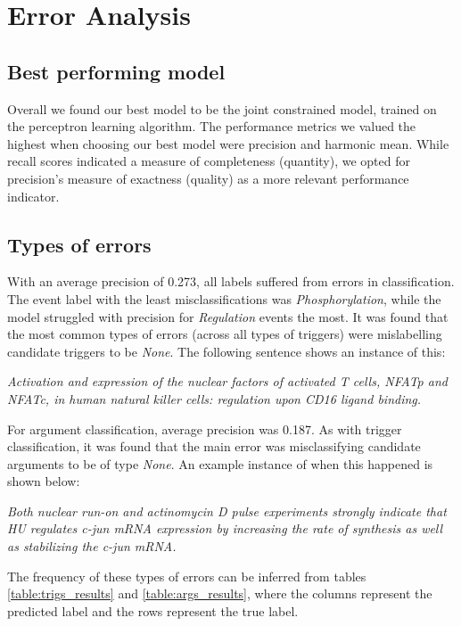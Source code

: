 \documentclass{article} %
\begin{document}
\section{Error Analysis}
\subsection{Best performing model}
Overall we found our best model to be the joint constrained model, trained on the perceptron learning algorithm. The performance metrics we valued the highest when choosing our best model were precision and harmonic mean. While recall scores indicated a measure of completeness (quantity), we opted for precision's measure of exactness (quality) as a more relevant performance indicator.

\subsection{Types of errors}
With an average precision of 0.273, all labels suffered from errors in classification. The event label with the least misclassifications was \emph{Phosphorylation}, while the model struggled with precision for \emph{Regulation} events the most. It was found that the most common types of errors (across all types of triggers) were mislabelling candidate triggers to be \emph{None}. The following sentence shows an instance of this:

\emph{Activation and expression of the nuclear factors of activated T cells, NFATp and NFATc, in human natural killer cells: regulation upon CD16 ligand binding.}

For argument classification, average precision was 0.187. As with trigger classification, it was found that the main error was misclassifying candidate arguments to be of type \emph{None}. An example instance of when this happened is shown below:

\emph{Both nuclear run-on and actinomycin D pulse experiments strongly indicate that HU regulates c-jun mRNA expression by increasing the rate of synthesis as well as stabilizing the c-jun mRNA.}

The frequency of these types of errors can be inferred from tables \ref{table:trigs_results} and \ref{table:args_results}, where the columns represent the predicted label and the rows represent the true label.
\end{document}
